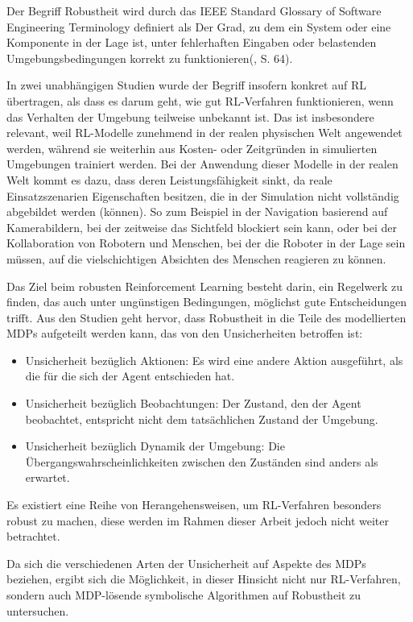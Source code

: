 \label{robustheit}

Der Begriff Robustheit wird durch das IEEE Standard Glossary of Software Engineering Terminology definiert als \glqq Der Grad, zu dem ein System oder eine Komponente in der Lage ist, unter fehlerhaften Eingaben oder belastenden Umgebungsbedingungen korrekt zu funktionieren\grqq{}(\cite{IEEE.1990}, S. 64).

In zwei unabhängigen Studien wurde der Begriff insofern konkret auf RL übertragen, als dass es darum geht, wie gut RL-Verfahren funktionieren, wenn das Verhalten der Umgebung teilweise unbekannt ist. Das ist insbesondere relevant, weil RL-Modelle zunehmend in der realen physischen Welt angewendet werden, während sie weiterhin aus Kosten- oder Zeitgründen in simulierten Umgebungen trainiert werden. Bei der Anwendung dieser Modelle in der realen Welt kommt es dazu, dass deren Leistungsfähigkeit sinkt, da reale Einsatzszenarien Eigenschaften besitzen, die in der Simulation nicht vollständig abgebildet werden (können). So zum Beispiel in der Navigation basierend auf Kamerabildern, bei der zeitweise das Sichtfeld blockiert sein kann, oder bei der Kollaboration von Robotern und Menschen, bei der die Roboter in der Lage sein müssen, auf die vielschichtigen Absichten des Menschen reagieren zu können\cite{Moos.2022}\cite{Ni.2021}.

Das Ziel beim robusten Reinforcement Learning besteht darin, ein Regelwerk zu finden, das auch unter ungünstigen Bedingungen, möglichst gute Entscheidungen trifft. Aus den Studien geht hervor, dass Robustheit in die Teile des modellierten MDPs aufgeteilt werden kann, das von den Unsicherheiten betroffen ist:

\begin{itemize}
	\item Unsicherheit bezüglich Aktionen: Es wird eine andere Aktion ausgeführt, als die für die sich der Agent entschieden hat.
	\item Unsicherheit bezüglich Beobachtungen: Der Zustand, den der Agent beobachtet, entspricht nicht dem tatsächlichen Zustand der Umgebung.
	\item Unsicherheit bezüglich Dynamik der Umgebung: Die Übergangswahrscheinlichkeiten zwischen den Zuständen sind anders als erwartet.
\end{itemize}

Es existiert eine Reihe von Herangehensweisen, um RL-Verfahren besonders robust zu machen, diese werden im Rahmen dieser Arbeit jedoch nicht weiter betrachtet\cite{Moos.2022}\cite{Ni.2021}.

Da sich die verschiedenen Arten der Unsicherheit auf Aspekte des MDPs beziehen, ergibt sich die Möglichkeit, in dieser Hinsicht nicht nur RL-Verfahren, sondern auch MDP-lösende symbolische Algorithmen auf Robustheit zu untersuchen.
